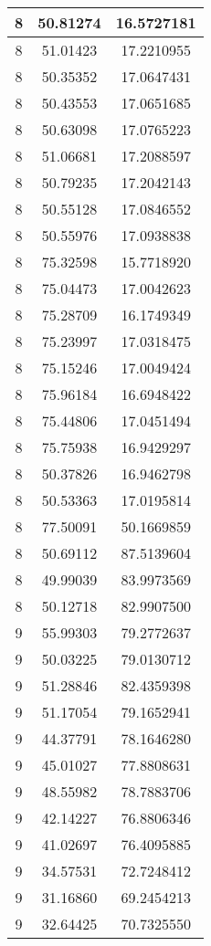 \documentclass[
]{book}
\begin{document}
\begin{tabular}{c|c|c}
\hline
8 & 50.81274 & 16.5727181\\
\hline
8 & 51.01423 & 17.2210955\\
\hline
8 & 50.35352 & 17.0647431\\
\hline
8 & 50.43553 & 17.0651685\\
\hline
8 & 50.63098 & 17.0765223\\
\hline
8 & 51.06681 & 17.2088597\\
\hline
8 & 50.79235 & 17.2042143\\
\hline
8 & 50.55128 & 17.0846552\\
\hline
8 & 50.55976 & 17.0938838\\
\hline
8 & 75.32598 & 15.7718920\\
\hline
8 & 75.04473 & 17.0042623\\
\hline
8 & 75.28709 & 16.1749349\\
\hline
8 & 75.23997 & 17.0318475\\
\hline
8 & 75.15246 & 17.0049424\\
\hline
8 & 75.96184 & 16.6948422\\
\hline
8 & 75.44806 & 17.0451494\\
\hline
8 & 75.75938 & 16.9429297\\
\hline
8 & 50.37826 & 16.9462798\\
\hline
8 & 50.53363 & 17.0195814\\
\hline
8 & 77.50091 & 50.1669859\\
\hline
8 & 50.69112 & 87.5139604\\
\hline
8 & 49.99039 & 83.9973569\\
\hline
8 & 50.12718 & 82.9907500\\
\hline
9 & 55.99303 & 79.2772637\\
\hline
9 & 50.03225 & 79.0130712\\
\hline
9 & 51.28846 & 82.4359398\\
\hline
9 & 51.17054 & 79.1652941\\
\hline
9 & 44.37791 & 78.1646280\\
\hline
9 & 45.01027 & 77.8808631\\
\hline
9 & 48.55982 & 78.7883706\\
\hline
9 & 42.14227 & 76.8806346\\
\hline
9 & 41.02697 & 76.4095885\\
\hline
9 & 34.57531 & 72.7248412\\
\hline
9 & 31.16860 & 69.2454213\\
\hline
9 & 32.64425 & 70.7325550\\

\end{tabular}
\end{document}
